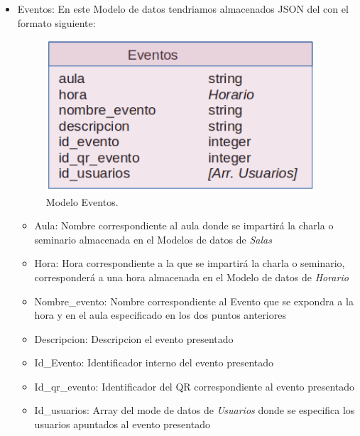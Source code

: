 \documentclass[a4paper, 12pt]{book}
\begin{document}
\begin{itemize}
	\item Eventos: En este Modelo de datos tendriamos almacenados JSON del con el formato siguiente:
	\begin{figure}[H]
  	\centering
  	\includegraphics[width=10cm, keepaspectratio]{img/mongoDBEventos.png}
  	\caption{Modelo Eventos.}\label{fig:mongoDBEventos}
	\end{figure}
		\begin{itemize}
		\item Aula: Nombre correspondiente al aula donde se impartirá la charla o seminario almacenada en el Modelos de datos de \textit{Salas}
		\item Hora: Hora correspondiente a la que se impartirá la charla o seminario, corresponderá a una hora almacenada en el Modelo de datos de \textit{Horario}
		\item Nombre\_evento: Nombre correspondiente al Evento que se expondra a la hora y en el aula especificado en los dos puntos anteriores
		\item Descripcion: Descripcion el evento presentado
		\item Id\_Evento: Identificador interno del evento presentado
		\item Id\_qr\_evento: Identificador del QR correspondiente al evento presentado
		\item Id\_usuarios: Array del mode de datos de \textit{Usuarios} donde se especifica los usuarios apuntados al evento presentado
		\end{itemize}
		

\end{itemize}
\end{document}
